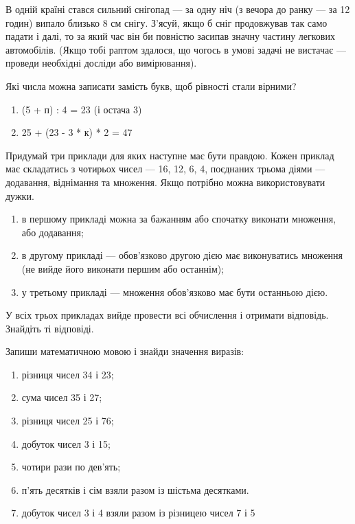 \problem
В одній країні стався сильний снігопад --- за одну ніч
(з вечора до ранку --- за 12 годин) випало близько 8 см снігу.
З'ясуй, якщо б сніг продовжував так само падати і далі,
то за який час він би повністю засипав значну частину легкових автомобілів.
(Якщо тобі раптом здалося, що чогось в умові задачі не вистачає ---
проведи необхідні досліди або вимірювання).


\problem
Які числа можна записати замість букв, щоб рівності стали вірними?
\begin{enumerate}
    \item (5 + п) : 4 = 23 (і остача 3)
    \item 25 + (23 - 3 * к) * 2 = 47
\end{enumerate}


\problem
Придумай три приклади для яких наступне має бути правдою.
Кожен приклад має складатись з чотирьох чисел --- 16, 12, 6, 4,
поєднаних трьома діями --- додавання, віднімання та множення.
Якщо потрібно можна використовувати дужки.
\begin{enumerate}
    \item в першому прикладі можна за бажанням або
    спочатку виконати множення, або додавання;
    \item в другому прикладі --- обов'язково другою дією має
    виконуватись множення (не вийде його виконати першим або останнім);
    \item у третьому прикладі --- множення обов'язково має бути останньою дією.
\end{enumerate}
У всіх трьох прикладах вийде провести всі обчислення і отримати відповідь. Знайдіть ті відповіді.


\problem
Запиши математичною мовою і знайди значення виразів:
\begin{enumerate}
    \item різниця чисел 34 і 23;
    \item сума чисел 35 і 27;
    \item різниця чисел 25 і 76;
    \item добуток чисел 3 і 15;
    \item чотири рази по дев'ять;
    \item п'ять десятків і сім взяли разом із шістьма десятками.
    \item добуток чисел 3 і 4 взяли разом із різницею чисел 7 і 5
\end{enumerate}



